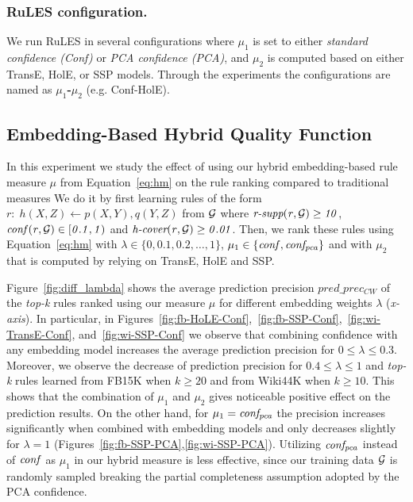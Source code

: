 \subsubsection{RuLES configuration.} 
We run RuLES in several configurations where $\mu_1$ is set to either \textit{standard confidence (Conf)} or \textit{PCA confidence (PCA)}, and $\mu_2$ is computed based on either TransE, HolE, or SSP models.
Through the experiments the configurations are named as \textbf{$\mu_1$-$\mu_2$} (e.g. Conf-HolE).


\subsection{Embedding-Based Hybrid Quality Function}

In this experiment we study the effect of using our hybrid embedding-based 
rule measure $\mu$ from Equation~\ref{eq:hm} on the 
rule ranking compared to traditional measures 
We do it by first 
learning rules of the form $r:\;h(X,Z) \leftarrow p(X,Y), q(Y,Z)$ from $\mathcal{G}$ where $\mathit{\textit{r-supp}(r,\mathcal{G})\geq 10}$, $\mathit{conf(r,\mathcal{G})\in [0.1,1)}$ and $\mathit{\textit{h-cover}(r,\mathcal{G})\geq 0.01}$. 
Then, we rank these rules using Equation~\ref{eq:hm} with $\lambda\in \{0, 0.1, 0.2, \dotsc, 1\}$, $\mu_1\in \{\mathit{conf,conf_{pca}}\}$ and with $\mu_2$ that is computed by relying on TransE, HolE and SSP.

Figure~\ref{fig:diff_lambda} shows the 
average prediction precision $pred\_prec_{CW}$ of the \textit{top-k} rules ranked using our measure $\mu$ for different embedding weights $\lambda$ (\textit{x-axis}). 
In particular, in Figures~\ref{fig:fb-HoLE-Conf},~\ref{fig:fb-SSP-Conf},~\ref{fig:wi-TransE-Conf}, and~\ref{fig:wi-SSP-Conf} 
we observe that combining confidence with any 
embedding model increases the average prediction precision for $0\leq \lambda\leq 0.3$. 
Moreover, we observe the decrease of prediction precision for $0.4 \leq \lambda\leq 1$ and \textit{top-k} rules learned from FB15K when $k\geq 20$ and from Wiki44K when $k\geq 10$. 
This 
shows that the combination of $\mu_1$ and $\mu_2$ gives noticeable positive effect 
on the prediction results.  On the other hand, for $\mu_1=\mathit{conf_{pca}}$ the precision increases significantly when combined with embedding models and only decreases slightly 
for $\lambda=1$ (Figures~\ref{fig:fb-SSP-PCA},\ref{fig:wi-SSP-PCA}). 
Utilizing $\mathit{conf_{pca}}$ instead of $\mathit{conf}$ as $\mu_1$ in our hybrid measure is less effective, since 
our training data $\mathcal{G}$ is randomly sampled 
breaking the 
partial completeness assumption adopted by the PCA confidence. 

